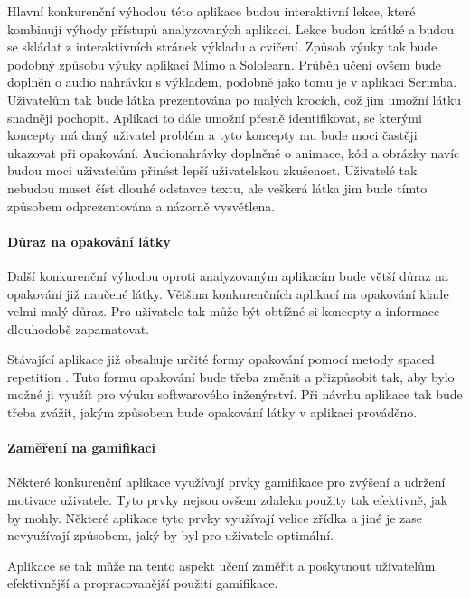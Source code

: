 Hlavní konkurenční výhodou této aplikace budou interaktivní lekce, které kombinují výhody přístupů analyzovaných aplikací. Lekce budou krátké a budou se skládat z interaktivních stránek výkladu a cvičení. Způsob výuky tak bude podobný způsobu výuky aplikací Mimo a Sololearn. Průběh učení ovšem bude doplněn o audio nahrávku s výkladem, podobně jako tomu je v aplikaci Scrimba. Uživatelům tak bude látka prezentována po malých krocích, což jim umožní látku snadněji pochopit. Aplikaci to dále umožní přesně identifikovat, se kterými koncepty má daný uživatel problém a tyto koncepty mu bude moci častěji ukazovat při opakování. Audionahrávky doplněné o animace, kód a obrázky navíc budou moci uživatelům přinést lepší uživatelskou zkušenost. Uživatelé tak nebudou muset číst dlouhé odstavce textu, ale veškerá látka jim bude tímto způsobem odprezentována a názorně vysvětlena.

\paragraph{Důraz na opakování látky}

Další konkurenční výhodou oproti analyzovaným aplikacím bude větší důraz na opakování již naučené látky. Většina konkurenčních aplikací na opakování klade velmi malý důraz. Pro uživatele tak může být obtížné si koncepty a informace dlouhodobě zapamatovat. 

Stávající aplikace již obsahuje určité formy opakování pomocí metody spaced repetition \cite{Hlavac2024BachelorThesis}. Tuto formu opakování bude třeba změnit a přizpůsobit tak, aby bylo možné ji využít pro výuku softwarového inženýrství. Při návrhu aplikace tak bude třeba zvážit, jakým způsobem bude opakování látky v aplikaci prováděno.

\paragraph{Zaměření na gamifikaci}

Některé konkurenční aplikace využívají prvky gamifikace pro zvýšení a udržení motivace uživatele. Tyto prvky nejsou ovšem zdaleka použity tak efektivně, jak by mohly. Některé aplikace tyto prvky využívají velice zřídka a jiné je zase nevyužívají způsobem, jaký by byl pro uživatele optimální.

Aplikace se tak může na tento aspekt učení zaměřit a poskytnout uživatelům efektivnější a propracovanější použití gamifikace.


